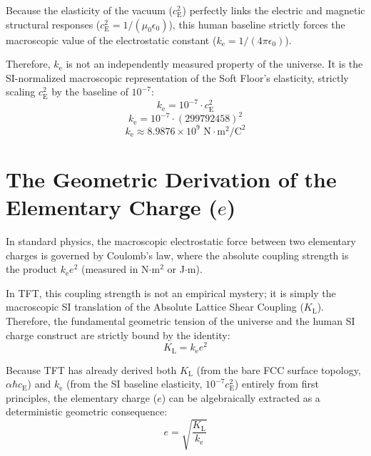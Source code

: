 Because the elasticity of the vacuum ($c_{\mathrm{E}}^2$) perfectly links the electric and magnetic structural responses ($c_{\mathrm{E}}^2 = 1/(\mu_0 \epsilon_0)$), this human baseline strictly forces the macroscopic value of the electrostatic constant ($k_{\mathrm{e}} = 1/(4\pi\epsilon_0)$).

Therefore, $k_{\mathrm{e}}$ is not an independently measured property of the universe. It is the SI-normalized macroscopic representation of the Soft Floor's elasticity, strictly scaling $c_{\mathrm{E}}^2$ by the baseline of $10^{-7}$:
\begin{equation}
    k_{\mathrm{e}} = 10^{-7} \cdot c_{\mathrm{E}}^2
\end{equation}
\begin{equation}
    k_{\mathrm{e}} = 10^{-7} \cdot (299792458)^2
\end{equation}
\begin{equation}
    k_{\mathrm{e}} \approx 8.9876 \times 10^9 \text{ N}\cdot\text{m}^2/\text{C}^2
\end{equation}

\section{The Geometric Derivation of the Elementary Charge ($e$)}
In standard physics, the macroscopic electrostatic force between two elementary charges is governed by Coulomb's law, where the absolute coupling strength is the product $k_{\mathrm{e}} e^2$ (measured in N$\cdot$m$^2$ or J$\cdot$m).

In TFT, this coupling strength is not an empirical mystery; it is simply the macroscopic SI translation of the Absolute Lattice Shear Coupling ($K_{\mathrm{L}}$). Therefore, the fundamental geometric tension of the universe and the human SI charge construct are strictly bound by the identity:
\begin{equation}
    K_{\mathrm{L}} = k_{\mathrm{e}} e^2
\end{equation}

Because TFT has already derived both $K_{\mathrm{L}}$ (from the bare FCC surface topology, $\alpha\hbar c_{\mathrm{E}}$) and $k_{\mathrm{e}}$ (from the SI baseline elasticity, $10^{-7} c_{\mathrm{E}}^2$) entirely from first principles, the elementary charge ($e$) can be algebraically extracted as a deterministic geometric consequence:
\begin{equation}
    e = \sqrt{\frac{K_{\mathrm{L}}}{k_{\mathrm{e}}}}
\end{equation}

